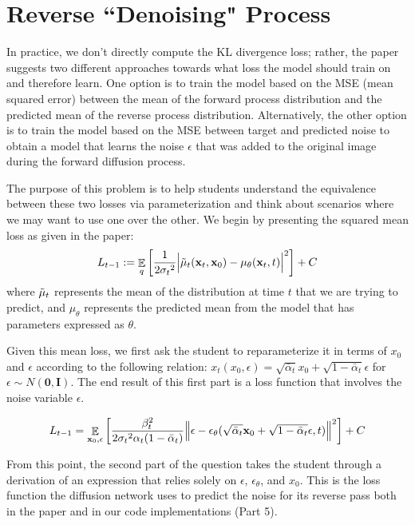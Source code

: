 \documentclass{article}
\DeclareMathOperator{\EX}{\mathbb{E}}%
\begin{document}
\section{Reverse ``Denoising" Process}

In practice, we don't directly compute the KL divergence loss;
rather, the paper suggests two different approaches towards what loss the model should train on and therefore learn.
One option is to train the model based on the MSE (mean squared error) between the mean of the forward process distribution and the predicted mean of the reverse process distribution. 
Alternatively, the other option is to train the model based on the MSE between target and predicted noise to obtain a model that learns the noise $\epsilon$ that was added to the original image during the forward diffusion process.

The purpose of this problem is to help students understand the equivalence between these two losses via parameterization and think about scenarios where we may want to use one over the other. We begin by presenting the squared mean loss as given in the paper: 
\begin{equation}
    L_{t-1} := \EX_q\left[\frac{1}{2{\sigma_t}^2}
    \Big\lvert {\Tilde\mu_t}(\textbf{x}_t, \textbf{x}_0) - {\mu_\theta}(\textbf{x}_t, t)\Big\rvert^2\right] + C
\end{equation}
where $\Tilde{\mu}_t$ represents the mean of the distribution at time $t$ that we are trying to predict,
and $\mu_{\theta}$ represents the predicted mean from the model that has parameters expressed as $\theta$.

Given this mean loss, we first ask the student to reparameterize it in terms of $x_0$ and $\epsilon$ according to the following relation: 
${x_t}(x_0, \epsilon) = \sqrt{\bar\alpha_t}x_0 + \sqrt{1 - \bar\alpha_t}\epsilon $  for $\epsilon \sim N(\boldsymbol{0}, \boldsymbol{I})$. The end result of this first part is a loss function that involves the noise variable $\epsilon$.

\begin{equation}
    L_{t-1} = \EX_{\textbf{x}_0, \epsilon}\left[\frac{\beta_t^2}{2{\sigma_t}^2\alpha_t(1 - \Bar{\alpha}_t)}
    \Big\lVert \epsilon - \epsilon_\theta(\sqrt{\Bar{\alpha}_t}\textbf{x}_0 + \sqrt{1 - \Bar{\alpha}_t}\epsilon, t)\Big\rVert^2\right] + C
\end{equation}

From this point, the second part of the question takes the student through a derivation of an expression that relies solely on $\epsilon$, $\epsilon_\theta$, and $x_0$. This is the loss function the diffusion network uses to predict the noise for its reverse pass both in the paper and in our code implementations (Part 5). 
\end{document}
